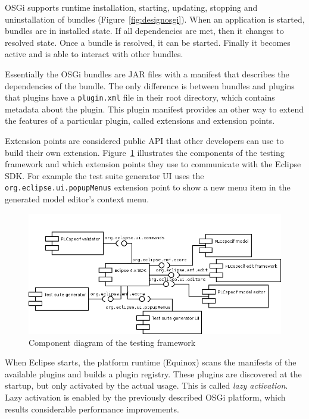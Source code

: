 OSGi supports runtime installation, starting, updating, stopping and uninstallation of bundles (Figure~\ref{fig:designosgi}). When an application is started, bundles are in installed state. If all dependencies are met, then it changes to resolved state. Once a bundle is resolved, it can be started. Finally it becomes active and is able to interact with other bundles.

Essentially the OSGi bundles are JAR files with a manifest that describes the dependencies of the bundle. The only difference is between bundles and plugins that plugins have a \texttt{plugin.xml} file in their root directory, which contains metadata about the plugin. This plugin manifest provides an other way to extend the features of a particular plugin, called extensions and extension points.

Extension points are considered public API that other developers can use to build their own extension. Figure~\ref{fig:designcomponents} illustrates the components of the testing framework and which extension points they use to communicate with the Eclipse SDK. For example the test suite generator UI uses the \texttt{org.eclipse.ui.popupMenus} extension point to show a new menu item in the generated model editor's context menu.

\begin{figure}[htp]
\centering
\includegraphics[scale=0.5]{figures/design_components.png}
\caption{Component diagram of the testing framework}
\label{fig:designcomponents}
\end{figure}

When Eclipse starts, the platform runtime (Equinox) scans the manifests of the available plugins and builds a plugin registry. These plugins are discovered at the startup, but only activated by the actual usage. This is called \textit{lazy activation}. Lazy activation is enabled by the previously described OSGi platform, which results considerable performance improvements.

